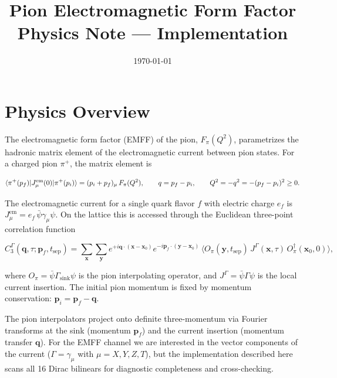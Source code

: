 \documentclass[11pt,a4paper]{article}
\title{\textbf{Pion Electromagnetic Form Factor}\\[4pt]
\large Physics Note --- \pyquda{} Implementation}
\author{}
\date{\today}
\newcommand{\gsink}{\Gamma_{\text{sink}}}
\newcommand{\gcur}{\Gamma}
\begin{document}
\maketitle

\section{Physics Overview}

The electromagnetic form factor (EMFF) of the pion, \(F_\pi(Q^2)\), parametrizes
the hadronic matrix element of the electromagnetic current between pion states.
For a charged pion \(\pi^+\), the matrix element is

\begin{equation}
\braket{\pi^+(p_f) | J_\mu^{\text{em}}(0) | \pi^+(p_i)}
  = (p_i + p_f)_\mu \, F_\pi(Q^2) ,
\qquad q=p_f-p_i,\qquad
Q^2 = -q^2 = -(p_f - p_i)^2 \ge 0 .
\label{eq:emff_def}
\end{equation}

The electromagnetic current for a single quark flavor \(f\) with electric charge
\(e_f\) is \(J_\mu^{\text{em}} = e_f \, \bar\psi \gamma_\mu \psi\).  On the
lattice this is accessed through the Euclidean three-point correlation function

\begin{equation}
C_3^\Gamma(\mathbf{q}, \tau; \mathbf{p}_f, t_{\text{sep}})
  = \sum_{\mathbf{x}} \sum_{\mathbf{y}}
    e^{+i\mathbf{q}\cdot(\mathbf{x}-\mathbf{x}_0)}
    e^{-i\mathbf{p}_f\cdot(\mathbf{y}-\mathbf{x}_0)} \,
    \big\langle
      O_\pi(\mathbf{y}, t_{\text{sep}}) \,
      J^\Gamma(\mathbf{x}, \tau) \,
      O_\pi^\dagger(\mathbf{x}_0, 0)
    \big\rangle ,
\label{eq:C3_operator}
\end{equation}

where \(O_\pi = \bar\psi \gsink \psi\) is the pion interpolating operator, and
\(J^\Gamma = \bar\psi \gcur \psi\) is the local current insertion.  The initial
pion momentum is fixed by momentum conservation:
\(\mathbf{p}_i = \mathbf{p}_f - \mathbf{q}\).

The pion interpolators project onto definite three-momentum via Fourier
transforms at the sink (momentum \(\mathbf{p}_f\)) and the current insertion
(momentum transfer \(\mathbf{q}\)).  For the EMFF channel we are interested in
the vector components of the current (\(\gcur = \gamma_\mu\) with \(\mu = X, Y,
Z, T\)), but the implementation described here scans all 16 Dirac bilinears for
diagnostic completeness and cross-checking.
\end{document}
